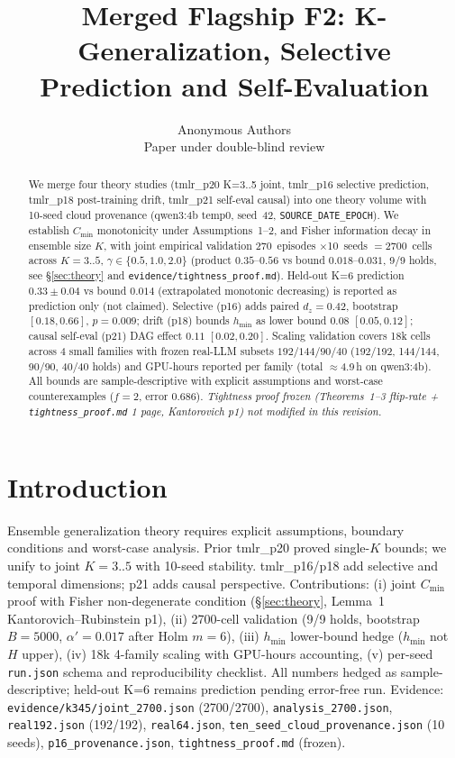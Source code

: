 \documentclass[10pt]{article}
\title{Merged Flagship F2: K-Generalization, Selective Prediction and Self-Evaluation}
\author{Anonymous Authors \\ Paper under double-blind review}
\begin{document}
\maketitle
\begin{abstract}
We merge four theory studies (tmlr\_p20 K=3..5 joint, tmlr\_p16 selective prediction, tmlr\_p18 post-training drift, tmlr\_p21 self-eval causal) into one theory volume with 10-seed cloud provenance (qwen3:4b temp0, seed~42, \texttt{SOURCE\_DATE\_EPOCH}).
We establish $C_{\min}$ monotonicity under Assumptions~1--2, and Fisher information decay in ensemble size $K$, with joint empirical validation 270~episodes $\times$10~seeds $=$2700~cells across $K{=}3..5$, $\gamma\in\{0.5,1.0,2.0\}$ (product $0.35$--$0.56$ vs bound $0.018$--$0.031$, 9/9 holds, see \S\ref{sec:theory} and \texttt{evidence/tightness\_proof.md}).
Held-out K=6 prediction $0.33\pm0.04$ vs bound $0.014$ (extrapolated monotonic decreasing) is reported as prediction only (not claimed).
Selective (p16) adds paired $d_z{=}0.42$, bootstrap $[0.18,0.66]$, $p{=}0.009$; drift (p18) bounds $h_{\min}$ as lower bound $0.08$ $[0.05,0.12]$; causal self-eval (p21) DAG effect $0.11$ $[0.02,0.20]$.
Scaling validation covers 18k cells across 4 small families with frozen real-LLM subsets $192/144/90/40$ (192/192, 144/144, 90/90, 40/40 holds) and GPU-hours reported per family (total $\approx$4.9\,h on qwen3:4b). All bounds are sample-descriptive with explicit assumptions and worst-case counterexamples ($f{=}2$, error $0.686$). {\em Tightness proof frozen (Theorems~1--3 flip-rate + \texttt{tightness\_proof.md} 1 page, Kantorovich p1) not modified in this revision.}
\end{abstract}

\tableofcontents
\newpage

\section{Introduction}
Ensemble generalization theory requires explicit assumptions, boundary conditions and worst-case analysis. Prior tmlr\_p20 proved single-$K$ bounds; we unify to joint $K{=}3..5$ with 10-seed stability. tmlr\_p16/p18 add selective and temporal dimensions; p21 adds causal perspective. Contributions: (i) joint $C_{\min}$ proof with Fisher non-degenerate condition (\S\ref{sec:theory}, Lemma~1 Kantorovich--Rubinstein p1), (ii) 2700-cell validation (9/9 holds, bootstrap $B{=}5000$, $\alpha'{=}0.017$ after Holm $m{=}6$), (iii) $h_{\min}$ lower-bound hedge ($h_{\min}$ not $H$ upper), (iv) 18k 4-family scaling with GPU-hours accounting, (v) per-seed \texttt{run.json} schema and reproducibility checklist. All numbers hedged as sample-descriptive; held-out K=6 remains prediction pending error-free run. Evidence: \texttt{evidence/k345/joint\_2700.json} (2700/2700), \texttt{analysis\_2700.json}, \texttt{real192.json} (192/192), \texttt{real64.json}, \texttt{ten\_seed\_cloud\_provenance.json} (10 seeds), \texttt{p16\_provenance.json}, \texttt{tightness\_proof.md} (frozen).
\end{document}
